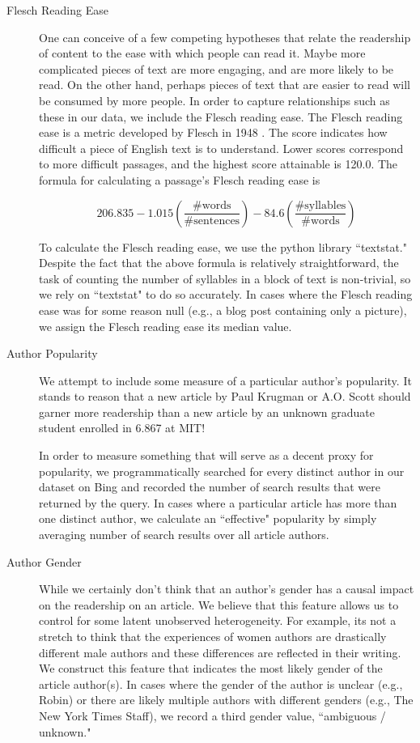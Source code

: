 \documentclass[fleqn,12pt]{SelfArx} %
\begin{document}
\begin{description}
	\item[Flesch Reading Ease] One can conceive of a few competing hypotheses that relate the readership of content to the ease with which people can read it. Maybe more complicated pieces of text are more engaging, and are more likely to be read. On the other hand, perhaps pieces of text that are easier to read will be consumed by more people. In order to capture relationships such as these in our data, we include the Flesch reading ease. The Flesch reading ease is a metric developed by Flesch in 1948 \cite{flesch1948new}. The score indicates how difficult a piece of English text is to understand. Lower scores correspond to more difficult passages, and the highest score attainable is 120.0. The formula for calculating a passage's Flesch reading ease is
	
	\begin{equation}
	206.835 - 1.015 \left ( \frac{\textrm{\# words}}{\textrm{\# sentences}} \right ) - 84.6 \left ( \frac{\textrm{\# syllables}}{\textrm{\# words}} \right )
	\end{equation}
	
	To calculate the Flesch reading ease, we use the python library ``textstat." Despite the fact that the above formula is relatively straightforward, the task of counting the number of syllables in a block of text is non-trivial, so we rely on ``textstat" to do so accurately. In cases where the Flesch reading ease was for some reason null (e.g., a blog post containing only a picture), we assign the Flesch reading ease its median value.
	
	\item[Author Popularity] We attempt to include some measure of a particular author's popularity. It stands to reason that a new article by Paul Krugman or A.O. Scott should garner more readership than a new article by an unknown graduate student enrolled in 6.867 at MIT! 
	
	In order to measure something that will serve as a decent proxy for popularity, we programmatically searched for every distinct author in our dataset on Bing and recorded the number of search results that were returned by the query. In cases where a particular article has more than one distinct author, we calculate an ``effective" popularity by simply averaging number of search results over all article authors.
	
	\item[Author Gender] While we certainly don't think that an author's gender has a causal impact on the readership on an article. We believe that this feature allows us to control for some latent unobserved heterogeneity. For example, its not a stretch to think that the experiences of women authors are drastically different male authors and these differences are reflected in their writing. We construct this feature that indicates the most likely gender of the article author(s). In cases where the gender of the author is unclear (e.g., Robin) or there are likely multiple authors with different genders (e.g., The New York Times Staff), we record a third gender value, ``ambiguous / unknown." 
	

\end{description}
\end{document}
